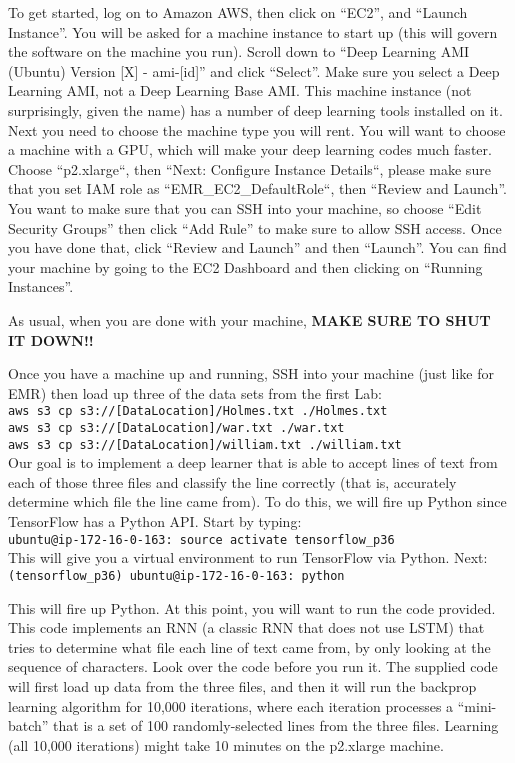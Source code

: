 \documentclass[11pt]{article}
\renewcommand\:{\colon} %
\begin{document}
To get started, log on to Amazon AWS, then click on ``EC2'', and ``Launch Instance''. You will be asked
for a machine instance to start up (this will govern the software on the machine you run). Scroll down to
``Deep Learning AMI (Ubuntu) Version [X] - ami-[id]'' and click ``Select''.  Make sure you select a Deep Learning AMI, not a Deep Learning Base AMI. This machine instance (not
surprisingly, given the name) has a number of deep learning tools installed on it. Next you need to choose
the machine type you will rent. You will want to choose a machine with a GPU, which will make your deep
learning codes much faster. Choose ``p2.xlarge``, then ``Next: Configure Instance Details``, please make sure that you set IAM role as ``EMR\_EC2\_DefaultRole``, then ``Review and Launch''. You want to make sure that you
can SSH into your machine, so choose ``Edit Security Groups'' then click ``Add Rule'' to make sure to allow
SSH access. Once you have done that, click ``Review and Launch'' and then ``Launch''. You can find your
machine by going to the EC2 Dashboard and then clicking on ``Running Instances''.

As usual, when you are done with your machine, \textbf{MAKE SURE TO SHUT IT DOWN!!}

Once you have a machine up and running, SSH into your machine (just like for EMR) then load up three
of the data sets from the first Lab:\\
\texttt{aws s3 cp s3://[DataLocation]/Holmes.txt ./Holmes.txt}\\
\texttt{aws s3 cp s3://[DataLocation]/war.txt ./war.txt}\\
\texttt{aws s3 cp s3://[DataLocation]/william.txt ./william.txt}\\

Our goal is to implement a deep learner that is able to accept lines of text from each of those three files
and classify the line correctly (that is, accurately determine which file the line came from). To do this, we
will fire up Python since TensorFlow has a Python API. Start by typing:\\

\texttt{ubuntu@ip-172-16-0-163: source activate tensorflow\_p36}\\

\noindent This will give you a virtual environment to run TensorFlow via Python. Next:\\
\texttt{(tensorflow\_p36) ubuntu@ip-172-16-0-163: python}


\noindent This will fire up Python. At this point, you will want to run the code provided. This code implements
an RNN (a classic RNN that does not use LSTM) that tries to determine what file each line of text came
from, by only looking at the sequence of characters. Look over the code before you run it. The supplied
code will first load up data from the three files, and then it will run the backprop learning algorithm for
10,000 iterations, where each iteration processes a ``mini-batch'' that is a set of 100 randomly-selected lines
from the three files. Learning (all 10,000 iterations) might take 10 minutes on the p2.xlarge machine.
\end{document}
